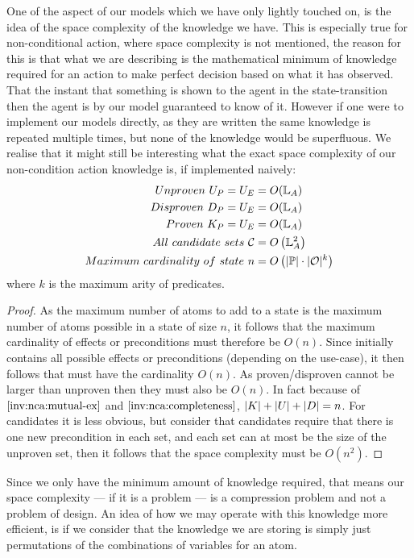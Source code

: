\documentclass[../Master.tex]{subfiles}
\begin{document}
One of the aspect of our models which we have only lightly touched on, is the idea of the space complexity of the knowledge we have.
This is especially true for non-conditional action, where space complexity is not mentioned, 
the reason for this is that what we are describing is the mathematical minimum of knowledge required for an action to make perfect decision based on what it has observed.
That the instant that something is shown to the agent in the state-transition then the agent is by our model guaranteed to know of it.
However if one were to implement our models directly, as they are written the same knowledge is repeated multiple times, but none of the knowledge would be superfluous.
We realise that it might still be interesting what the exact space complexity of our non-condition action knowledge is, if implemented naively:
 \begin{align*}
 	Unproven ~U_P = U_E & = O(\mathbb{L}_A) \\
 	Disproven~D_P = U_E & = O(\mathbb{L}_A) \\
 	Proven~K_P = U_E &= O(\mathbb{L}_A) \\
 	All ~ candidate~sets~ \mathcal{C} & = O\left(\mathbb{L}_A^2\right) \\
    Maximum ~ cardinality~ of ~ state  ~ n & = O \left( |\mathbb{P}| \cdot |\mathcal{O}| ^k \right) \\
 \end{align*} 
 where $k$ is the maximum arity of predicates.
 \begin{proof} 
 	As the maximum number of atoms to add to a state is the maximum number of atoms possible in a state of size $n$,
 	it follows that the maximum cardinality of effects or preconditions must therefore be $O(n)$.
Since \up initially contains all possible effects or preconditions (depending on the use-case), 
	it then follows that \Up must have the cardinality $O(n)$. 
	As proven/disproven cannot be larger than unproven then they must also be $O(n)$.
	In fact because of $\Cref{inv:nca:mutual-ex}$ and $\Cref{inv:nca:completeness}$, $|K|+|U|+|D| = n$.
	For candidates it is less obvious, but consider that candidates require that there is one new precondition in
	each set, and each set can at most be the size of the unproven set, then it follows that the space complexity must be $O(n^2)$.
 \end{proof}
Since we only have the minimum amount of knowledge required, that means our space complexity --- if it is a problem --- is a compression problem and not a problem of design. 
An idea of how we may operate with this knowledge more efficient, is if we consider that the knowledge we are storing is simply just permutations of the combinations of variables for an atom.
\end{document}
